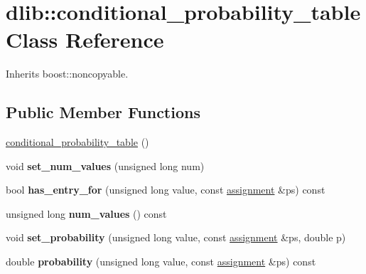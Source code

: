 \hypertarget{classdlib_1_1conditional__probability__table}{
\section{dlib::conditional\_\-probability\_\-table Class Reference}
\label{classdlib_1_1conditional__probability__table}
}


Inherits boost::noncopyable.\subsection*{Public Member Functions}
\begin{DoxyCompactItemize}
\item 
\hyperlink{classdlib_1_1conditional__probability__table_a0b0989c283746263c7f339f10da7b59e}{conditional\_\-probability\_\-table} ()
\item 
\hypertarget{classdlib_1_1conditional__probability__table_a3ffa4aa9ba7bb1eabf149f2a79cf36cb}{
void {\bfseries set\_\-num\_\-values} (unsigned long num)}
\label{classdlib_1_1conditional__probability__table_a3ffa4aa9ba7bb1eabf149f2a79cf36cb}

\item 
\hypertarget{classdlib_1_1conditional__probability__table_aa90e4a805f3681b5827d61f9fd8008eb}{
bool {\bfseries has\_\-entry\_\-for} (unsigned long value, const \hyperlink{classdlib_1_1assignment}{assignment} \&ps) const }
\label{classdlib_1_1conditional__probability__table_aa90e4a805f3681b5827d61f9fd8008eb}

\item 
\hypertarget{classdlib_1_1conditional__probability__table_a7d8e2b5658bb4a4822cc8ca907549491}{
unsigned long {\bfseries num\_\-values} () const }
\label{classdlib_1_1conditional__probability__table_a7d8e2b5658bb4a4822cc8ca907549491}

\item 
\hypertarget{classdlib_1_1conditional__probability__table_a3ebb76d3b0897f1680c452f2773a03c4}{
void {\bfseries set\_\-probability} (unsigned long value, const \hyperlink{classdlib_1_1assignment}{assignment} \&ps, double p)}
\label{classdlib_1_1conditional__probability__table_a3ebb76d3b0897f1680c452f2773a03c4}

\item 
\hypertarget{classdlib_1_1conditional__probability__table_a62071a87ac8c6d5615e805069347efd7}{
double {\bfseries probability} (unsigned long value, const \hyperlink{classdlib_1_1assignment}{assignment} \&ps) const }
\label{classdlib_1_1conditional__probability__table_a62071a87ac8c6d5615e805069347efd7}


\end{DoxyCompactItemize}
